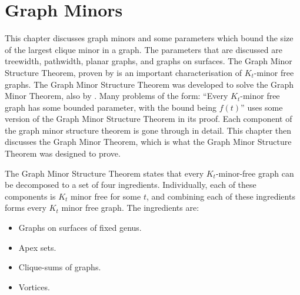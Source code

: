 \chapter{Graph Minors}\label{chap:gmst}
This chapter discusses graph minors and some parameters which bound the size of the largest clique minor in a graph. The parameters that are discussed are treewidth, pathwidth, planar graphs, and graphs on surfaces. 
The Graph Minor Structure Theorem, proven by \textcite{robertsonGraphMinorsXVI2003} is an important characterisation of $K_t$-minor free graphs. The Graph Minor Structure Theorem was developed to solve the Graph Minor Theorem, also by \textcite{robertsonGraphMinorsXX2004}. Many problems of the form: ``Every $K_t$-minor free graph has some bounded parameter, with the bound being $f(t)$'' uses some version of the Graph Minor Structure Theorem in its proof. 
Each component of the graph minor structure theorem is gone through in detail. This chapter then discusses the Graph Minor Theorem, which is what the Graph Minor Structure Theorem was designed to prove.

The Graph Minor Structure Theorem states that every $K_t$-minor-free graph can be decomposed to a set of four ingredients. Individually, each of these components is $K_t$ minor free for some $t$, and combining each of these ingredients forms every $K_t$ minor free graph. The ingredients are:
\begin{itemize}
	\item Graphs on surfaces of fixed genus.
	\item Apex sets.
	\item Clique-sums of graphs.
	\item Vortices.
\end{itemize}












\newpage
